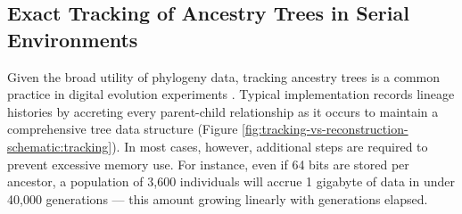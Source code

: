 


\subsection{Exact Tracking of Ancestry Trees in Serial Environments}

Given the broad utility of phylogeny data, tracking ancestry trees is a common practice in digital evolution experiments \citep{ray1992evolution,bohm2017mabe,de2012deap,garwood2019revosim,godin2019apoget,dolson2024phylotrackpy,haller2023slim,Guillaume2006,OFallon2010,Thornton2014,okamoto2017framework,Vlachos2018,schumaker2018hexsim,MattheyDoret2021}.
Typical implementation records lineage histories by accreting every parent-child relationship as it occurs to maintain a comprehensive tree data structure \citep{moreno2024algorithms} (Figure \ref{fig:tracking-vs-reconstruction-schematic:tracking}).
In most cases, however, additional steps are required to prevent excessive memory use.
For instance, even if 64 bits are stored per ancestor, a population of 3,600 individuals will accrue 1 gigabyte of data in under 40,000 generations --- this amount growing linearly with generations elapsed.

